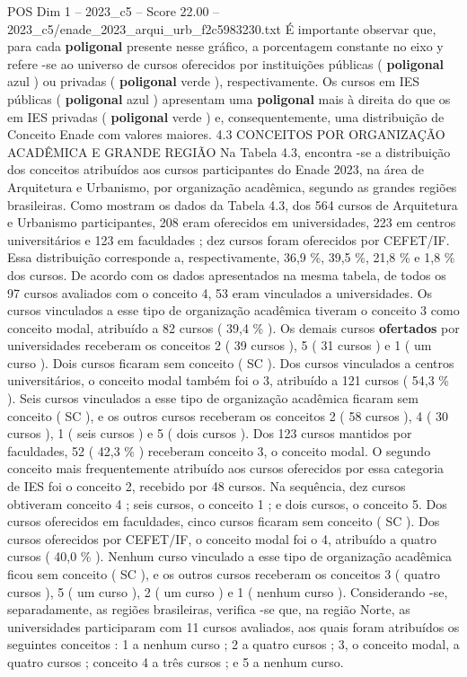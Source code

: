 \begin{textsample}{POS Dim 1 – 2023\_c5 – Score 22.00 – 2023\_c5/enade\_2023\_arqui\_urb\_f2c5983230.txt}
É importante observar que, para cada \textbf{poligonal} presente nesse gráfico, a porcentagem constante no eixo y refere -se ao universo de cursos oferecidos por instituições públicas ( \textbf{poligonal} azul ) ou privadas ( \textbf{poligonal} verde ), respectivamente.
Os cursos em IES públicas ( \textbf{poligonal} azul ) apresentam uma \textbf{poligonal} mais à direita do que os em IES privadas ( \textbf{poligonal} verde ) e, consequentemente, uma distribuição de Conceito Enade com valores maiores. 4.3 CONCEITOS POR ORGANIZAÇÃO ACADÊMICA E GRANDE REGIÃO Na Tabela 4.3, encontra -se a distribuição dos conceitos atribuídos aos cursos participantes do Enade 2023, na área de Arquitetura e Urbanismo, por organização acadêmica, segundo as grandes regiões brasileiras.
Como mostram os dados da Tabela 4.3, dos 564 cursos de Arquitetura e Urbanismo participantes, 208 eram oferecidos em universidades, 223 em centros universitários e 123 em faculdades ; dez cursos foram oferecidos por CEFET/IF.
Essa distribuição corresponde a, respectivamente, 36,9 \%, 39,5 \%, 21,8 \% e 1,8 \% dos cursos.
De acordo com os dados apresentados na mesma tabela, de todos os 97 cursos avaliados com o conceito 4, 53 eram vinculados a universidades.
Os cursos vinculados a esse tipo de organização acadêmica tiveram o conceito 3 como conceito modal, atribuído a 82 cursos ( 39,4 \% ).
Os demais cursos \textbf{ofertados} por universidades receberam os conceitos 2 ( 39 cursos ), 5 ( 31 cursos ) e 1 ( um curso ).
Dois cursos ficaram sem conceito ( SC ).
Dos cursos vinculados a centros universitários, o conceito modal também foi o 3, atribuído a 121 cursos ( 54,3 \% ).
Seis cursos vinculados a esse tipo de organização acadêmica ficaram sem conceito ( SC ), e os outros cursos receberam os conceitos 2 ( 58 cursos ), 4 ( 30 cursos ), 1 ( seis cursos ) e 5 ( dois cursos ).
Dos 123 cursos mantidos por faculdades, 52 ( 42,3 \% ) receberam conceito 3, o conceito modal.
O segundo conceito mais frequentemente atribuído aos cursos oferecidos por essa categoria de IES foi o conceito 2, recebido por 48 cursos.
Na sequência, dez cursos obtiveram conceito 4 ; seis cursos, o conceito 1 ; e dois cursos, o conceito 5.
Dos cursos oferecidos em faculdades, cinco cursos ficaram sem conceito ( SC ).
Dos cursos oferecidos por CEFET/IF, o conceito modal foi o 4, atribuído a quatro cursos ( 40,0 \% ).
Nenhum curso vinculado a esse tipo de organização acadêmica ficou sem conceito ( SC ), e os outros cursos receberam os conceitos 3 ( quatro cursos ), 5 ( um curso ), 2 ( um curso ) e 1 ( nenhum curso ).
Considerando -se, separadamente, as regiões brasileiras, verifica -se que, na região Norte, as universidades participaram com 11 cursos avaliados, aos quais foram atribuídos os seguintes conceitos : 1 a nenhum curso ; 2 a quatro cursos ; 3, o conceito modal, a quatro cursos ; conceito 4 a três cursos ; e 5 a nenhum curso.

\end{textsample}
